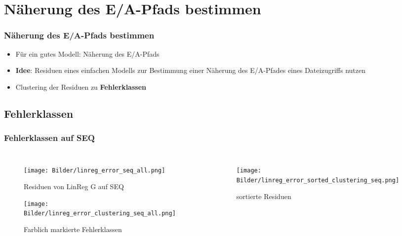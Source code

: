 \documentclass{beamer}
\begin{document}
\section{Näherung des E/A-Pfads bestimmen}
\begin{frame}
\frametitle{Näherung des E/A-Pfads bestimmen}
\begin{itemize}
	\item Für ein gutes Modell: Näherung des E/A-Pfads
	\item \textbf{Idee}: Residuen eines einfachen Modells zur Bestimmung einer Näherung des E/A-Pfades eines Dateizugriffs nutzen
	\item Clustering der Residuen zu \textbf{Fehlerklassen} 
\end{itemize}
\end{frame}
\subsection{Fehlerklassen}
\begin{frame}
\frametitle{Fehlerklassen auf SEQ}
\begin{columns}
	\begin{figure}
		\texttt{[image: Bilder/linreg\_error\_seq\_all.png]}\\
		\vspace*{-0.45cm}
		\caption{Residuen von LinReg G auf SEQ}
		\texttt{[image: Bilder/linreg\_error\_clustering\_seq\_all.png]}\\
		\vspace*{-0.45cm}
		\caption{Farblich markierte Fehlerklassen}
	\end{figure}
	\begin{figure}		
		\texttt{[image: Bilder/linreg\_error\_sorted\_clustering\_seq.png]}
		\vspace*{-0.45cm}		
		\caption{sortierte Residuen}
	\end{figure}
\end{columns}
\end{frame}
\end{document}
